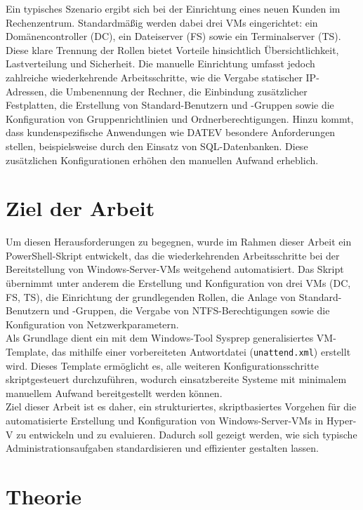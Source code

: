 \documentclass[a4paper,12pt]{article}
\begin{document}
Ein typisches Szenario ergibt sich bei der Einrichtung eines neuen Kunden im Rechenzentrum. Standardmä\ss ig werden dabei drei VMs eingerichtet: ein Domänencontroller (DC), ein Dateiserver (FS) sowie ein Terminalserver (TS). Diese klare Trennung der Rollen bietet Vorteile hinsichtlich Übersichtlichkeit, Lastverteilung und Sicherheit.
Die manuelle Einrichtung umfasst jedoch zahlreiche wiederkehrende Arbeitsschritte, wie die Vergabe statischer IP-Adressen, die Umbenennung der Rechner, die Einbindung zusätzlicher Festplatten, die Erstellung von Standard-Benutzern und -Gruppen sowie die Konfiguration von Gruppenrichtlinien und Ordnerberechtigungen.
Hinzu kommt, dass kundenspezifische Anwendungen wie DATEV besondere Anforderungen stellen, beispielsweise durch den Einsatz von SQL-Datenbanken. Diese zusätzlichen Konfigurationen erhöhen den manuellen Aufwand erheblich.\\

\section{Ziel der Arbeit}

Um diesen Herausforderungen zu begegnen, wurde im Rahmen dieser Arbeit ein PowerShell-Skript entwickelt, das die wiederkehrenden Arbeitsschritte bei der Bereitstellung von Windows-Server-VMs weitgehend automatisiert. Das Skript übernimmt unter anderem die Erstellung und Konfiguration von drei VMs (DC, FS, TS), die Einrichtung der grundlegenden Rollen, die Anlage von Standard-Benutzern und -Gruppen, die Vergabe von NTFS-Berechtigungen sowie die Konfiguration von Netzwerkparametern.\\

Als Grundlage dient ein mit dem Windows-Tool Sysprep generalisiertes VM-Template, das mithilfe einer vorbereiteten Antwortdatei (\lstinline|unattend.xml|) erstellt wird. Dieses Template ermöglicht es, alle weiteren Konfigurationsschritte skriptgesteuert durchzuführen, wodurch einsatzbereite Systeme mit minimalem manuellem Aufwand bereitgestellt werden können.\\

Ziel dieser Arbeit ist es daher, ein strukturiertes, skriptbasiertes Vorgehen für die automatisierte Erstellung und Konfiguration von Windows-Server-VMs in Hyper-V zu entwickeln und zu evaluieren. Dadurch soll gezeigt werden, wie sich typische Administrationsaufgaben standardisieren und effizienter gestalten lassen.\\

\section{Theorie}
\end{document}
